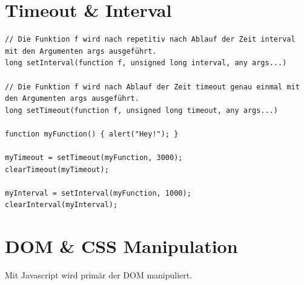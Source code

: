 \section{Timeout \& Interval}
\begin{lstlisting}[label=lst:timeout-interval,caption=Timeout \& Interval]
// Die Funktion f wird nach repetitiv nach Ablauf der Zeit interval mit den Argumenten args ausgeführt.
long setInterval(function f, unsigned long interval, any args...)

// Die Funktion f wird nach Ablauf der Zeit timeout genau einmal mit den Argumenten args ausgeführt.
long setTimeout(function f, unsigned long timeout, any args...)

function myFunction() { alert("Hey!"); }

myTimeout = setTimeout(myFunction, 3000);
clearTimeout(myTimeout);

myInterval = setInterval(myFunction, 1000);
clearInterval(myInterval);
\end{lstlisting}

\section{DOM \& CSS Manipulation}
Mit Javascript wird primär der DOM manipuliert. 

